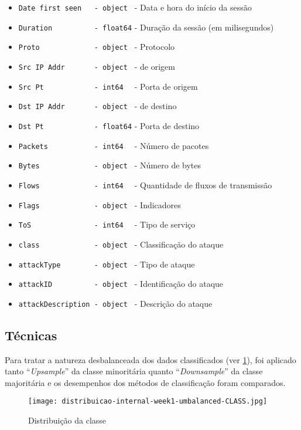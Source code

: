 \documentclass[twoside]{article}
\begin{document}
\begin{itemize}
    \item \texttt{Date first seen~~ - object } - Data e hora do início da sessão
    \item \texttt{Duration~~~~~~~~~ - float64} - Duração da sessão (em milisegundos)
    \item \texttt{Proto~~~~~~~~~~~~ - object } - Protocolo
    \item \texttt{Src IP Addr~~~~~~ - object } -  de origem
    \item \texttt{Src Pt~~~~~~~~~~~ - int64~~} - Porta de origem
    \item \texttt{Dst IP Addr~~~~~~ - object } -  de destino
    \item \texttt{Dst Pt~~~~~~~~~~~ - float64} - Porta de destino
    \item \texttt{Packets~~~~~~~~~~ - int64~~} - Número de pacotes
    \item \texttt{Bytes~~~~~~~~~~~~ - object } - Número de \glspl{byte}
    \item \texttt{Flows~~~~~~~~~~~~ - int64~~} - Quantidade de fluxos de transmissão
    \item \texttt{Flags~~~~~~~~~~~~ - object } - Indicadores 
    \item \texttt{ToS~~~~~~~~~~~~~~ - int64~~} - Tipo de serviço
    \item \texttt{class~~~~~~~~~~~~ - object } - Classificação do ataque
    \item \texttt{attackType~~~~~~~ - object } - Tipo de ataque
    \item \texttt{attackID~~~~~~~~~ - object } - Identificação do ataque
    \item \texttt{attackDescription - object } - Descrição do ataque
\end{itemize}

\subsection{Técnicas}

Para tratar a natureza desbalanceada dos dados classificados (ver \cref{fig:umbalanced-class}), foi aplicado tanto ``\textit{Upsample}'' da classe minoritária quanto ``\textit{Downsample}'' da classe majoritária e os desempenhos dos métodos de classificação foram comparados.

\begin{figure}
    \centering
    \texttt{[image: distribuicao-internal-week1-umbalanced-CLASS.jpg]}
    \caption{Distribuição da classe}\label{fig:umbalanced-class}
\end{figure}
\end{document}
